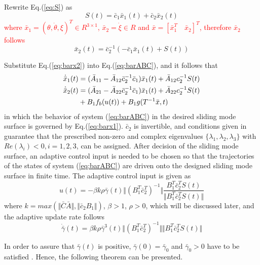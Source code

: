 \documentclass[3p]{elsarticle}
\theoremstyle{plain}
\begin{document}
Rewrite Eq.(\ref{eq:S}) as
\begin{equation}
S(t) = \bar{c}_1\bar{x}_1(t)+\bar{c}_2\bar{x}_2(t)
\end{equation}
\textcolor{red}{where $\bar{x}_1 =(\theta,\dot \theta,\xi)^T\in R^{3\times 1}$, $\bar{x}_2 = \dot \xi\in R$ and $\bar{x} = [\bar{x}_1^T \quad \bar{x}_2]^T$, therefore $\bar{x}_2$ follows}
\begin{equation}
\bar{x}_2(t) = \bar{c}_2^{-1}(-\bar{c}_1\bar{x}_1(t)+S(t))\label{eq:barx2}
\end{equation}\par
Substitute Eq.(\ref{eq:barx2}) into Eq.(\ref{eq:barABC}), and it follows that
\begin{align}
\dot{\bar{x}}_1(t) &= (\bar{A}_{11}-\bar{A}_{12}\bar{c}_2^{-1}\bar{c}_1)\bar{x}_1(t)+\bar{A}_{12}c_2^{-1}S(t)\label{eq:barx1}\\
\dot{\bar{x}}_2(t) &= (\bar{A}_{21}-\bar{A}_{22}\bar{c}_2^{-1}\bar{c}_1)\bar{x}_1(t)+\bar{A}_{22}c_2^{-1}S(t)\notag\\&+B_1f_b(u(t))+B_1g(T^{-1}\bar{x},t)
\end{align}
in which the behavior of system (\ref{eq:barABC}) in the desired sliding mode surface is governed by Eq.(\ref{eq:barx1}). $\bar{c}_2$ is invertible, and conditions given in \cite{lyshevski2012control} guarantee that the prescribed non-zero and complex eigenvalues $\{\lambda_1,\lambda_2,\lambda_{3}\}$ with $Re(\lambda_i)<0,i=1,2,3$, can be assigned.
After decision of the sliding mode surface, an adaptive control input is needed to be chosen so that the trajectories of the states of system (\ref{eq:barABC}) are driven onto the designed sliding mode surface in finite time. The adaptive control input is given as
\begin{equation}
u(t) = -\beta k \rho \bar{\gamma}(t)\Vert(B_1^T\bar{c}_2^T)^{-1}\Vert\frac{B_1^T\bar{c}_2^TS(t)}{\Vert B_1^T\bar{c}_2^TS(t)\Vert}\label{eq:ut}
\end{equation}
where $k = max(\Vert\bar{C}\bar{A}\Vert,\Vert\bar{c}_2B_1\Vert)$, $\beta >1$, $\rho > 0$, which will be discussed later, and the adaptive update rate follows
\begin{equation}
\dot{\bar{\gamma}}(t) = \beta k \rho \bar{\gamma}^3(t)\Vert(B_1^T\bar{c}_2^T)^{-1}\Vert\Vert B_1^T\bar{c}_2^TS(t)\Vert
\end{equation}\par
In order to assure that $\bar{\gamma}(t)$ is positive, $\bar{\gamma}(0)=\bar{\gamma}_0$ and $\bar{\gamma}_0 > 0$ have to be satisfied \cite{Hu2008Robust}. Hence, the following theorem can be presented.
\end{document}
